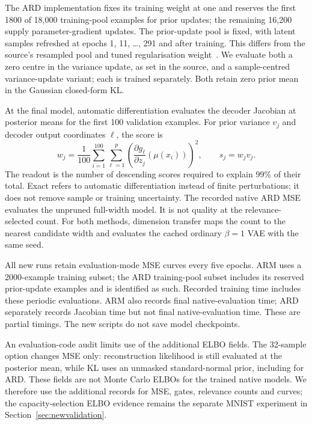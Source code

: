 \documentclass[make,article,submit,pdftex,moreauthors]{Definitions/mdpi}
\begin{document}
The ARD implementation fixes its training weight at one and reserves
the first 1800 of 18,000 training-pool examples for prior updates; the
remaining 16,200 supply parameter-gradient updates. The prior-update
pool is fixed, with latent samples refreshed at epochs 1, 11, \ldots,
291 and after training. This differs from the source's resampled pool
and tuned regularisation weight~\cite{saha2025ardvae}. We evaluate both
a zero centre in the variance update, as set in the source, and a
sample-centred variance-update variant; each is trained separately.
Both retain zero prior mean in the Gaussian closed-form KL.

At the final model, automatic differentiation evaluates the decoder
Jacobian at posterior means for the first 100 validation examples.
For prior variance $v_j$ and decoder output coordinates $\ell$, the score is
\begin{equation}
 w_j=\frac{1}{100}\sum_{i=1}^{100}\sum_{\ell=1}^{p}
 \left(\frac{\partial g_\ell}{\partial z_j}(\mu(x_i))\right)^2,
 \qquad s_j=w_jv_j.
 \label{eq:exactard}
\end{equation}
The readout is the number of descending scores required to explain
99\% of their total. Exact refers to automatic differentiation instead
of finite perturbations; it does not remove sample or training uncertainty.
The recorded native ARD MSE evaluates the unpruned full-width model.
It is not quality at the relevance-selected count. For both methods,
dimension transfer maps the count to the nearest candidate width and
evaluates the cached ordinary $\beta=1$ VAE with the same seed.

All new runs retain evaluation-mode MSE curves every five epochs.
ARM uses a 2000-example training subset; the ARD training-pool subset
includes its reserved prior-update examples and is identified as such.
Recorded training time includes these periodic evaluations. ARM also
records final native-evaluation time; ARD separately records Jacobian
time but not final native-evaluation time. These are partial timings.
The new scripts do not save model checkpoints.

An evaluation-code audit limits use of the additional ELBO fields.
The 32-sample option changes MSE only: reconstruction likelihood is still
evaluated at the posterior mean, while KL uses an unmasked standard-normal
prior, including for ARD. These fields are not Monte Carlo ELBOs for the
trained native models. We therefore use the additional records for MSE,
gates, relevance counts and curves; the capacity-selection ELBO evidence
remains the separate MNIST experiment in Section~\ref{sec:newvalidation}.
\end{document}
